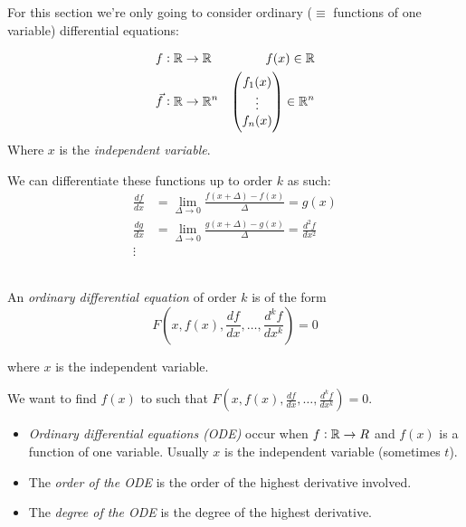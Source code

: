 \documentclass[10pt]{scrartcl}
\begin{document}
\TableofContents

\setcounter{page}{3}


\vspace*{5pt}


For 
this section we're only going to consider ordinary ($\equiv$ functions of one variable) differential equations:

\begin{align*}
&f: \mathbb{R} \to \mathbb{R} & f(x) \in \mathbb{R}\\
&\vec{f}: \mathbb{R} \to \mathbb{R}^n & \begin{pmatrix}f_1(x)\\\vdots\\f_n(x)\end{pmatrix} \in \mathbb{R}^n
\end{align*}
Where $x$ is the \emph{independent variable}. 

We can differentiate these functions up to order $k$ as such:
\[
\begin{aligned}
  \frac{df}{dx} &= \lim_{\Delta \to 0} \frac{f(x + \Delta) - f(x)}{\Delta} = g(x)\\[0.2cm]
  \frac{dg}{dx} &= \lim_{\Delta \to 0} \frac{g(x + \Delta) - g(x)}{\Delta} = \frac{d^2f}{dx^2}\\
  \vdots
\end{aligned}
\]~


\begin{definition}
An \emph{ordinary differential equation} of order $k$ is of the form
\[F\left(x,f(x),\frac{df}{dx},\dots,\frac{d^kf}{dx^k}\right) = 0\]

where $x$ is the independent variable.
\end{definition}

We want to find $f(x)$ to such that $F\left(x,f(x),\frac{df}{dx},\dots,\frac{d^kf}{dx^k}\right) = 0$.

\begin{itemize}
\item \emph{Ordinary differential equations (ODE)} occur when $f: \mathbb{R} \to R$ and $f(x)$ is a function of one variable. Usually $x$ is the independent variable (sometimes $t$). 

\item The \emph{order of the ODE} is the order of the highest derivative involved. 
\item The \emph{degree of the ODE} is the degree of the highest derivative.
\end{itemize}
\end{document}
